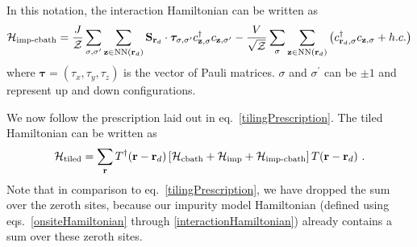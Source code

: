 \documentclass[reprint,hidelinks,onecolumn]{revtex4-2}
\begin{document}
In this notation, the interaction Hamiltonian can be written as
\begin{equation}\begin{aligned}\label{interactionHamiltonian}
	\mathcal{H}_\text{imp-cbath} = \frac{J}{\mathcal{Z}}\sum_{\sigma,\sigma^\prime}\sum_{{\bf z}\in\text{NN}({\bf r}_d)} {\bf S}_{{\bf r}_d}\cdot{\boldsymbol \tau}_{\sigma,\sigma^\prime}c^\dagger_{{\bf z},\sigma}c_{{\bf z},\sigma^\prime} - \frac{V}{\sqrt{\mathcal{Z}}}\sum_{\sigma} \sum_{{\bf z}\in\text{NN}({\bf r}_d)}\left(c^\dagger_{{\bf r}_d,\sigma} c_{{{\bf z}},\sigma} + h.c.\right)
\end{aligned}\end{equation}
where \(\boldsymbol \tau = \left( \tau_x, \tau_y, \tau_z \right) \) is the vector of Pauli matrices. \(\sigma\) and \(\sigma^\prime\) can be \(\pm 1\) and represent up and down configurations.

We now follow the prescription laid out in eq.~\ref{tilingPrescription}. The tiled Hamiltonian can be written as 
\begin{equation}\begin{aligned}
	\mathcal{H}_\text{tiled} = \sum_{{\bf r}}T^\dagger({\bf r} - {\bf r}_d)\left[\mathcal{H}_\text{cbath} + \mathcal{H}_\text{imp} + \mathcal{H}_\text{imp-cbath}\right]T({\bf r} - {\bf r}_d)~.
\end{aligned}\end{equation}
Note that in comparison to eq.~\ref{tilingPrescription}, we have dropped the sum over the zeroth sites, because our impurity model Hamiltonian (defined using eqs.~\ref{onsiteHamiltonian} through \ref{interactionHamiltonian}) already contains a sum over these zeroth sites.
\end{document}
